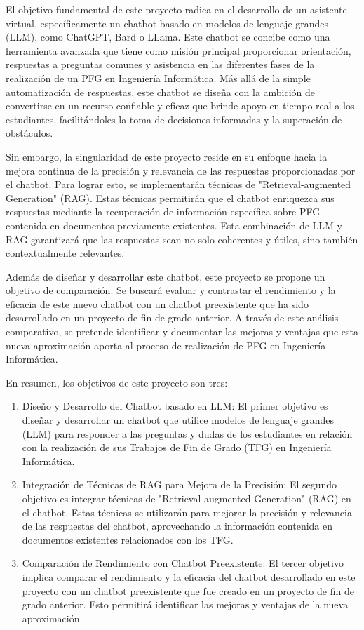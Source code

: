 
El objetivo fundamental de este proyecto radica en el desarrollo de un asistente virtual, específicamente un chatbot basado en modelos de lenguaje grandes (LLM), como ChatGPT, Bard o LLama. Este chatbot se concibe como una herramienta avanzada que tiene como misión principal proporcionar orientación, respuestas a preguntas comunes y asistencia en las diferentes fases de la realización de un PFG en Ingeniería Informática. Más allá de la simple automatización de respuestas, este chatbot se diseña con la ambición de convertirse en un recurso confiable y eficaz que brinde apoyo en tiempo real a los estudiantes, facilitándoles la toma de decisiones informadas y la superación de obstáculos.

Sin embargo, la singularidad de este proyecto reside en su enfoque hacia la mejora continua de la precisión y relevancia de las respuestas proporcionadas por el chatbot. Para lograr esto, se implementarán técnicas de "Retrieval-augmented Generation" (RAG). Estas técnicas permitirán que el chatbot enriquezca sus respuestas mediante la recuperación de información específica sobre PFG contenida en documentos previamente existentes. Esta combinación de LLM y RAG garantizará que las respuestas sean no solo coherentes y útiles, sino también contextualmente relevantes.

Además de diseñar y desarrollar este chatbot, este proyecto se propone un objetivo de comparación. Se buscará evaluar y contrastar el rendimiento y la eficacia de este nuevo chatbot con un chatbot preexistente que ha sido desarrollado en un proyecto de fin de grado anterior. A través de este análisis comparativo, se pretende identificar y documentar las mejoras y ventajas que esta nueva aproximación aporta al proceso de realización de PFG en Ingeniería Informática.

En resumen, los objetivos de este proyecto son tres:
\begin{enumerate}
    \item Diseño y Desarrollo del Chatbot basado en LLM: El primer objetivo es diseñar y desarrollar un chatbot que utilice modelos de lenguaje grandes (LLM) para responder a las preguntas y dudas de los estudiantes en relación con la realización de sus Trabajos de Fin de Grado (TFG) en Ingeniería Informática.
    
    \item Integración de Técnicas de RAG para Mejora de la Precisión: El segundo objetivo es integrar técnicas de "Retrieval-augmented Generation" (RAG) en el chatbot. Estas técnicas se utilizarán para mejorar la precisión y relevancia de las respuestas del chatbot, aprovechando la información contenida en documentos existentes relacionados con los TFG.

    \item Comparación de Rendimiento con Chatbot Preexistente: El tercer objetivo implica comparar el rendimiento y la eficacia del chatbot desarrollado en este proyecto con un chatbot preexistente que fue creado en un proyecto de fin de grado anterior. Esto permitirá identificar las mejoras y ventajas de la nueva aproximación.
    
\end{enumerate}

